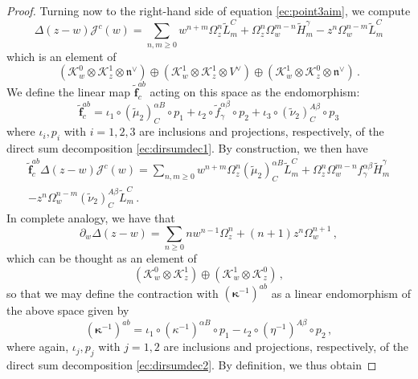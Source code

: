 \documentclass[10pt,a4paper]{amsart}
\newcommand{\CK}{{\mathcal K}}
\newcommand{\fn}{\mathfrak{n}}
\newcommand{\tH}{{\tilde H}}
\newcommand{\tL}{{\tilde L}}
\begin{document}
\begin{proof}
Turning now to the right-hand side of equation \eqref{ec:point3aim}, we compute 
\begin{equation}
    \Delta(z-w)\mathcal{J}^c(w)=\sum_{n,m\geq 0}w^{n+m}\Omega_z^n\tL_m^C + \Omega_z^n\Omega_{w}^{m-n}\tH_m^\gamma -z^n\Omega_w^{n-m}\tL_m^C
\end{equation}
which is an element of 
\begin{equation}
\label{ec:dirsumdec1}
    (\mathcal{K}_w^0\otimes \mathcal{K}_z^1\otimes \fn^\vee)\oplus(\mathcal{K}_w^1\otimes \mathcal{K}_z^1\otimes V^\vee)\oplus(\mathcal{K}_w^1\otimes \mathcal{K}_z^0\otimes \fn^\vee)\,.
\end{equation}
We define the linear map $\mathbf{\tilde f}^{ab}_c$ acting on this space as the endomorphism:
\begin{equation}
    \mathbf{\tilde f}^{ab}_c=\iota_1 \circ (\tilde{\mu}_2)^{\alpha B}_C \circ p_1 + \iota_2 \circ \tilde f^{\alpha \beta}_\gamma\circ p_2 + \iota_3 \circ (\tilde{\nu}_2)^{A\beta}_C \circ p_3
\end{equation}
where $\iota_i,p_i$ with $i=1,2,3$ are inclusions and projections, respectively, of the direct sum decomposition \eqref{ec:dirsumdec1}. By construction, we then have 
\begin{multline}
\label{ec:granf1}
    \mathbf{\tilde f}^{ab}_c\Delta(z-w)\mathcal{J}^c(w) = \sum_{n,m\geq 0}w^{n+m}\Omega_z^n(\tilde{\mu}_2)^{\alpha B}_C\tL_m^C + \Omega_z^n\Omega_{w}^{m-n}f^{\alpha \beta}_\gamma\tH_m^\gamma \\
    -z^n\Omega_w^{n-m}(\tilde{\nu}_2)^{A\beta}_C\tL_m^C\,.
\end{multline}
In complete analogy, we have that
\begin{equation}
    \partial_w\Delta(z-w)=\sum_{n\geq 0} nw^{n-1}\Omega_z^n + (n+1)z^n\Omega_w^{n+1}\,,
\end{equation}
which can be thought as an element of 
\begin{equation}
\label{ec:dirsumdec2}
    (\CK_w^0\otimes \CK_z^1)\oplus(\CK_w^1\otimes \CK_z^0)\,,
\end{equation}
so that we may define the contraction with $(\bm{\kappa}^{-1})^{ab}$ as a linear endomorphism of the above space given by 
\begin{equation}
    (\bm{\kappa}^{-1})^{ab}=\iota_1\circ (\kappa^{-1})^{\alpha B}\circ p_1 - \iota_2\circ (\eta^{-1})^{A\beta}\circ p_2\,,
\end{equation}
where again, $\iota_j,p_j$ with $j=1,2$ are inclusions and projections, respectively, of the direct sum decomposition \eqref{ec:dirsumdec2}. By definition, we thus obtain

\end{proof}
\end{document}

